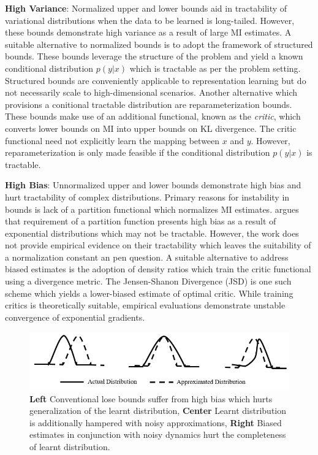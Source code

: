 \documentclass{article}
\begin{document}
\textbf{High Variance}: Normalized upper and lower bounds aid in tractability of variational distributions when the data to be learned is long-tailed. However, these bounds demonstrate high variance as a result of large MI estimates. A suitable alternative to normalized bounds is to adopt the framework of structured bounds. These bounds leverage the structure of the problem and yield a known conditional distribution $p(y|x)$ which is tractable as per the problem setting. Structured bounds are conveniently applicable to representation learning \cite{cpc,variational} but do not necessarily scale to high-dimensional scenarios. Another alternative which provisions a conitional tractable distribution are reparameterization bounds. These bounds make use of an additional functional, known as the \textit{critic}, which converts lower bounds on MI into upper bounds on KL divergence. The critic functional need not explicitly learn the mapping between $x$ and $y$. However, reparameterization is only made feasible if the conditional distribution $p(y|x)$ is tractable. 

\textbf{High Bias}: Unnormalized upper and lower bounds demonstrate high bias and hurt tractability of complex distributions. Primary reasons for instability in bounds is lack of a partition functional which normalizes MI estimates. \cite{variational} argues that requirement of a partition function presents high bias as a result of exponential distributions which may not be tractable. However, the work does not provide empirical evidence on their tractability which leaves the suitability of a normalization constant an pen question. A suitable alternative to address biased estimates is the adoption of density ratios which train the critic functional using a divergence metric. The Jensen-Shanon Divergence (JSD) is one such scheme which yields a lower-biased estimate of optimal critic. While training critics is theoretically suitable, empirical evaluations \cite{variational} demonstrate unstable convergence of exponential gradients. 

\begin{figure}[ht]
  \centering
  \includegraphics[height=2.5cm,width=13cm]{dist.PNG}
  \caption{\textbf{Left} Conventional lose bounds suffer from high bias which hurts generalization of the learnt distribution, \textbf{Center} Learnt distribution is additionally hampered with noisy approximations, \textbf{Right} Biased estimates in conjunction with noisy dynamics hurt the completeness of learnt distribution.}
  \label{fig:dist}
\end{figure}
\end{document}
